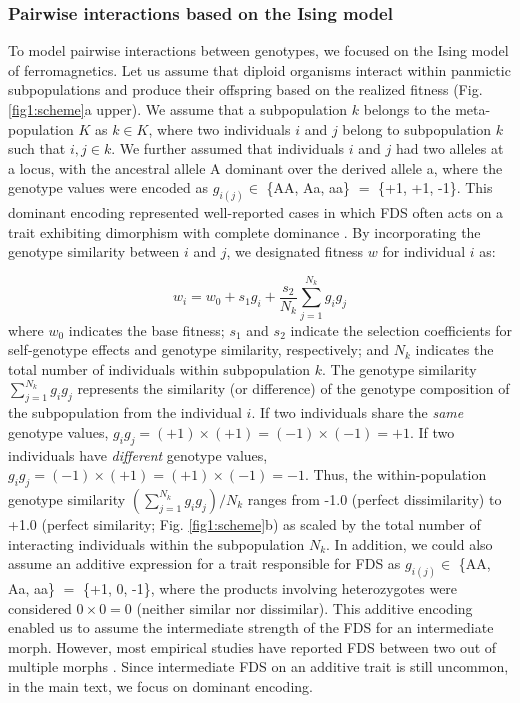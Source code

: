 \documentclass[12pt,]{article}
\begin{document}
\subsubsection{Pairwise interactions based on the Ising model}
To model pairwise interactions between genotypes, we focused on the Ising model of ferromagnetics. Let us assume that diploid organisms interact within panmictic subpopulations and produce their offspring based on the realized fitness (Fig. \ref{fig1:scheme}a upper). We assume that a subpopulation $k$ belongs to the meta-population $K$ as $k \in K$, where two individuals $i$ and $j$ belong to subpopulation $k$ such that $i,j \in k$. We further assumed that individuals $i$ and $j$ had two alleles at a locus, with the ancestral allele A dominant over the derived allele a, where the genotype values were encoded as $g_{i(j)} \in$ \{AA, Aa, aa\} $=$ \{+1, +1, -1\}. This dominant encoding represented well-reported cases in which FDS often acts on a trait exhibiting dimorphism with complete dominance \citep[e.g.,][]{takahashi2010negative,sato2017herbivore}. By incorporating the genotype similarity between $i$ and $j$, we designated fitness $w$ for individual $i$ as:

\begin{equation}
w_i = w_0 + s_1 g_i + \frac{s_2}{N_k}\sum^{N_{k}}_{j=1}{g_ig_j}\label{eq:1}
\end{equation}
\noindent
where $w_0$ indicates the base fitness; $s_1$ and $s_2$ indicate the selection coefficients for self-genotype effects and genotype similarity, respectively; and $N_k$ indicates the total number of individuals within subpopulation $k$. The genotype similarity $\sum^{N_{k}}_{j=1}{g_ig_j}$ represents the similarity (or difference) of the genotype composition of the subpopulation from the individual $i$. If two individuals share the \textit{same} genotype values, $g_ig_j = (+1)\times(+1) = (-1)\times(-1) = +1$. If two individuals have \textit{different} genotype values, $g_ig_j = (-1)\times(+1) = (+1)\times(-1) = -1$. Thus, the within-population genotype similarity $(\sum^{N_{k}}_{j=1}{g_ig_j})/N_k$ ranges from -1.0 (perfect dissimilarity) to +1.0 (perfect similarity; Fig. \ref{fig1:scheme}b) as scaled by the total number of interacting individuals within the subpopulation $N_k$. In addition, we could also assume an additive expression for a trait responsible for FDS as $g_{i(j)} \in$ \{AA, Aa, aa\} $=$ \{+1, 0, -1\}, where the products involving heterozygotes were considered $0 \times 0 = 0$ (neither similar nor dissimilar). This additive encoding enabled us to assume the intermediate strength of the FDS for an intermediate morph. However, most empirical studies have reported FDS between two out of multiple morphs \citep[e.g.,][]{gigord2001negative,takahashi2010negative,le2015evolutionary,sato2017herbivore,nosil2018natural}. Since intermediate FDS on an additive trait is still uncommon, in the main text, we focus on dominant encoding.
\end{document}
